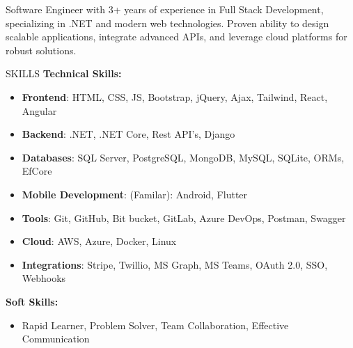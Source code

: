 \documentclass{resume} %
\begin{document}

\begin{rSection}%

{Software Engineer with 3+ years of experience in Full Stack Development, specializing in .NET and modern web technologies. Proven ability to design scalable applications, integrate advanced APIs, and leverage cloud platforms for robust solutions. %
}


\end{rSection}


\begin{rSection}{SKILLS}
\textbf{Technical Skills:}
\begin{itemize}
	\item \textbf{Frontend}: HTML, CSS, JS, Bootstrap, jQuery, Ajax, Tailwind, React, Angular
	\item \textbf{Backend}:  .NET, .NET Core, Rest API's, Django
	\item \textbf{Databases}: SQL Server, PostgreSQL, MongoDB, MySQL, SQLite, ORMs, EfCore
	\item \textbf{Mobile Development}: (Familar): Android, Flutter
	\item \textbf{Tools}: Git, GitHub, Bit bucket, GitLab, Azure DevOps, Postman, Swagger
	\item \textbf{Cloud}: AWS, Azure, Docker, Linux
	\item \textbf{Integrations}: Stripe, Twillio, MS Graph, MS Teams, OAuth 2.0, SSO, Webhooks
	
\end{itemize}


\textbf{Soft Skills:} 
\begin{itemize}
\item Rapid Learner, Problem Solver, Team Collaboration, Effective Communication
\end{itemize}


\end{rSection}
\end{document}
